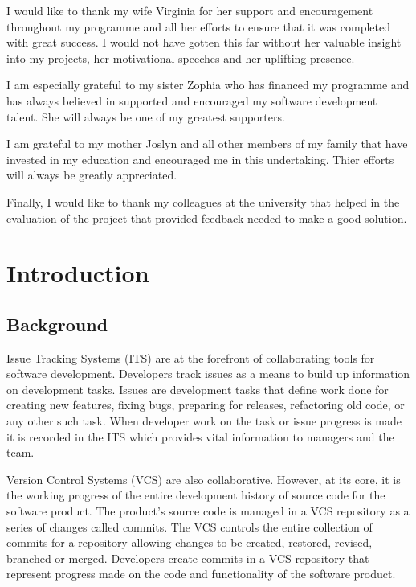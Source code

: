 \documentclass{mproj}
\begin{document}
I would like to thank my wife Virginia for her support and encouragement throughout my programme and all her efforts to ensure that it was completed with great success. I would not have gotten this far without her valuable insight into my projects, her motivational speeches and her uplifting presence.

I am especially grateful to my sister Zophia who has financed my programme and has always believed in supported and encouraged my software development talent. She will always be one of my greatest supporters.

I am grateful to my mother Joslyn and all other members of my family that have invested in my education and encouraged me in this undertaking. Thier efforts will always be greatly appreciated.

Finally, I would like to thank my colleagues at the university that helped in the evaluation of the project that provided feedback needed to make a good solution.

\tableofcontents




\chapter{Introduction}\label{intro}

\section{Background}

Issue Tracking Systems (ITS) are at the forefront of collaborating tools for software development. Developers track issues as a means to build up information on development tasks. Issues are development tasks that define work done for creating new features, fixing bugs, preparing for releases, refactoring old code, or any other such task. When developer work on the task or issue progress is made it is recorded in the ITS which provides vital information to managers and the team.


Version Control Systems (VCS) are also collaborative. However, at its core, it is the working progress of the entire development history of source code for the software product. The product's source code is managed in a VCS repository as a series of changes called commits. The VCS controls the entire collection of commits for a repository allowing changes to be created, restored, revised, branched or merged. Developers create commits in a VCS repository that represent progress made on the code and functionality of the software product.
\end{document}
